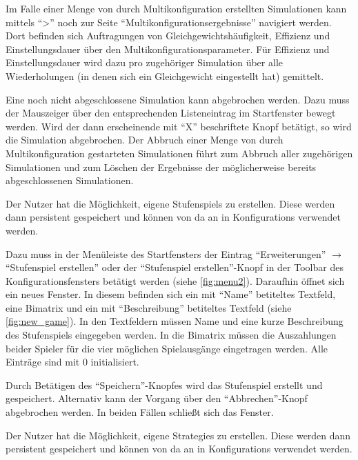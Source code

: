 \documentclass[parskip=full,11pt]{scrartcl}
\begin{document}
Im Falle einer Menge von durch Multikonfiguration erstellten Simulationen kann mittels \enquote{>} noch zur Seite \enquote{Multikonfigurationsergebnisse} navigiert werden. Dort befinden sich Auftragungen von Gleichgewichtshäufigkeit, \Gls{Effizienz} und \Gls{Einstellungsdauer} über den Multikonfigurationsparameter. Für \Gls{Effizienz} und \Gls{Einstellungsdauer} wird dazu pro zugehöriger Simulation über alle Wiederholungen (in denen sich ein \Gls{Gleichgewicht} eingestellt hat) gemittelt.

Eine noch nicht abgeschlossene Simulation kann abgebrochen werden. Dazu muss der Mauszeiger über den entsprechenden Listeneintrag im Startfenster bewegt werden. Wird der dann erscheinende mit \enquote{X} beschriftete Knopf betätigt, so wird die Simulation abgebrochen. Der Abbruch einer Menge von durch Multikonfiguration gestarteten Simulationen führt zum Abbruch aller zugehörigen Simulationen und zum Löschen der Ergebnisse der möglicherweise bereits abgeschlossenen Simulationen.

Der \Gls{Nutzer} hat die Möglichkeit, eigene \Glspl{Stufenspiel} zu erstellen. Diese werden dann persistent gespeichert und können von da an in \Glspl{Konfiguration} verwendet werden.

Dazu muss in der Menüleiste des Startfensters der Eintrag \enquote{Erweiterungen} \(\rightarrow\) \enquote{\Gls{Stufenspiel} erstellen} oder der \enquote{\Gls{Stufenspiel} erstellen}-Knopf in der Toolbar des Konfigurationsfensters betätigt werden (siehe \cref{fig:menu2}). Daraufhin öffnet sich ein neues Fenster. In diesem befinden sich ein mit \enquote{Name} betiteltes Textfeld, eine \Gls{Bimatrix} und ein mit \enquote{Beschreibung} betiteltes Textfeld (siehe \cref{fig:new_game}). In den Textfeldern müssen Name und eine kurze Beschreibung des \Gls{Stufenspiel}s eingegeben werden. In die \Gls{Bimatrix} müssen die Auszahlungen beider Spieler für die vier möglichen Spielausgänge eingetragen werden. Alle Einträge sind mit \(0\) initialisiert.

Durch Betätigen des \enquote{Speichern}-Knopfes wird das \Gls{Stufenspiel} erstellt und gespeichert. Alternativ kann der Vorgang über den \enquote{Abbrechen}-Knopf abgebrochen werden. In beiden Fällen schließt sich das Fenster.

Der \Gls{Nutzer} hat die Möglichkeit, eigene \Glspl{Strategie} zu erstellen. Diese werden dann persistent gespeichert und können von da an in \Glspl{Konfiguration} verwendet werden.
\end{document}
